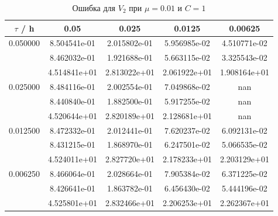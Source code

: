 \documentclass[specialist,subf,href,colorlinks=true,12pt
,times,mtpro,specialist
]{disser}
\begin{document}
\begin{table}[H]
\small
\caption{Ошибка для $V_2$ при $\mu=0.01$ и $C = 1$}
\begin{center}
\begin{tabular}{|c|c|c|c|c|}
\hline
$\tau$ / h & 0.05 & 0.025 & 0.0125 & 0.00625 \\
\hline
0.050000 & 8.504541e-01  & 2.015802e-01  & 5.956985e-02  & 4.510771e-02 \\
 & 8.462032e-01  & 1.921688e-01  & 5.663115e-02  & 3.325543e-02 \\
 & 4.514841e+01  & 2.813022e+01  & 2.061922e+01  & 1.908164e+01 \\
\hline
0.025000 & 8.484116e-01  & 2.002554e-01  & 7.049868e-02  & nan \\
 & 8.440840e-01  & 1.882500e-01  & 5.917255e-02  & nan \\
 & 4.520644e+01  & 2.820189e+01  & 2.128681e+01  & nan \\
\hline
0.012500 & 8.472332e-01  & 2.012441e-01  & 7.620237e-02  & 6.092131e-02 \\
 & 8.431215e-01  & 1.868970e-01  & 6.247501e-02  & 5.066535e-02 \\
 & 4.524011e+01  & 2.827720e+01  & 2.178233e+01  & 2.203129e+01 \\
\hline
0.006250 & 8.466064e-01  & 2.028664e-01  & 7.905384e-02  & 6.371225e-02 \\
 & 8.426641e-01  & 1.863782e-01  & 6.456430e-02  & 5.444196e-02 \\
 & 4.525801e+01  & 2.832466e+01  & 2.206253e+01  & 2.262367e+01 \\
\hline
\end{tabular}
\end{center}
\end{table}
\end{document}
